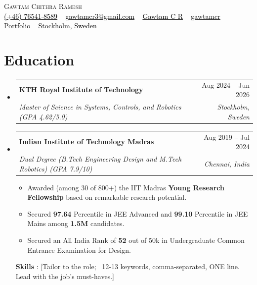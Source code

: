 \documentclass[letterpaper, 11pt]{article}
\makeatletter
\newcommand{\vTableRowSep}{-2pt}   %
\newcommand{\vItemTop}{-2pt}       %
\newcommand{\vSubheadingEnd}{-10pt}%
\newcommand{\vListStart}{-0.3em}   %
\newcommand{\vListGroupEnd}{-1em}  %
\newcommand{\vHeadingName}{3pt}    %
\newcommand{\vHeadingEnd}{-8pt}    %
\newcommand{\vEduSep}{0pt}         %
\newcommand{\vEduItemSep}{-0.3em}  %
\newcommand{\vEduSkills}{-0.7em}   %
\newcommand{\resumeSubheading}[4]{
\vspace{\vItemTop}
\item
\begin{tabular*}{1.0\textwidth}[t]{l@{\extracolsep{\fill}}r}
	\textbf{#1}       & {\small #2} \\
     [\vTableRowSep]
	\textit{{\small#3}} & \textit{\small #4} \\
\end{tabular*}
\vspace{\vSubheadingEnd}
}
\newcommand{\resumeSubHeadingListStart}{\begin{itemize}[leftmargin=0.0in, label={}]}
\newcommand{\resumeSubHeadingListEnd}{\end{itemize}\vspace{\vListGroupEnd}}
\makeatother
\begin{document}
\begin{center}
    {\Huge \scshape Gawtam Chithra Ramesh} \\
    \vspace{\vHeadingName}
    \small
    { \href{tel:+46764518589}{{\faMobile*} \textcolor{black}{(+46) 76541-8589}} ~
    \href{mailto:gawtamcr3@gmail.com}{{\faPaperPlane} \textcolor{black}{gawtamcr3@gmail.com}} ~
    \href{https://linkedin.com/in/gawtamcr/}{{\faLinkedinIn} \textcolor{black}{Gawtam C R}} ~
    \href{https://github.com/gawtamcr}{{\faGithub} \textcolor{black}{gawtamcr}} ~
    \href{https://gawtamcr.github.io/}{{\faGlobe} \textcolor{black}{Portfolio}} ~
    \href{https://maps.google.com/?q=Stockholm,Sweden}{{\faMapMarker*} \textcolor{black}{Stockholm, Sweden}}
    }
    \vspace{\vHeadingEnd}
\end{center}

\section{\color{Blue}Education}
    \resumeSubHeadingListStart
    \resumeSubheading{KTH Royal Institute of Technology}{Aug 2024 -- Jun 2026}{Master of Science in Systems, Controls, and Robotics \textnormal{(GPA 4.62/5.0)}}{Stockholm, Sweden}
    \vspace{\vEduSep}
    \resumeSubheading{Indian Institute of Technology Madras}{Aug 2019 -- Jul 2024}{Dual Degree (B.Tech Engineering Design and M.Tech Robotics) \textnormal{(GPA 7.9/10)}}{Chennai, India}
    \vspace{\vListStart}
    \small{
    \begin{itemize}[leftmargin=0.15in]
        \setlength{\itemsep}{\vEduItemSep}
        \item Awarded (among 30 of 800+) the IIT Madras \textbf{Young Research Fellowship} based on remarkable research potential.
        \item Secured \textbf{97.64} Percentile in JEE Advanced and \textbf{99.10} Percentile in JEE Mains among \textbf{1.5M} candidates.
        \item Secured an All India Rank of \textbf{52} out of 50k in Undergraduate Common Entrance Examination for Design.
    \end{itemize}
    }
    \vspace{\vEduSkills}
    \textbf{Skills} : [Tailor to the role; ~12-13 keywords, comma-separated, ONE line. Lead with the job's must-haves.]
    \resumeSubHeadingListEnd
\end{document}
